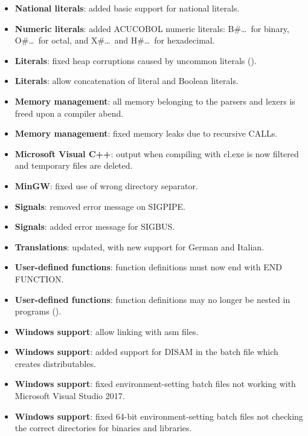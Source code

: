 \begin{itemize}
\item \textbf{National literals}: added basic support for national literals.
\item \textbf{Numeric literals}: added ACUCOBOL numeric literals: B\#\ldots\, for binary, O\#\ldots\, for octal, and X\#\ldots\ and H\#\ldots\, for hexadecimal.
\item \textbf{Literals}: fixed heap corruptions caused by uncommon literals ().
\item \textbf{Literals}: allow concatenation of literal and Boolean literals.
\item \textbf{Memory management}: all memory belonging to the parsers and lexers is freed upon a compiler abend.
\item \textbf{Memory management}: fixed memory leaks due to recursive CALLs.
\item \textbf{Microsoft Visual C++}: output when compiling with cl.exe is now filtered and temporary files are deleted.
\item \textbf{MinGW}: fixed use of wrong directory separator.
\item \textbf{Signals}: removed error message on SIGPIPE.
\item \textbf{Signals}: added error message for SIGBUS.
\item \textbf{Translations}: updated, with new support for German and Italian.
\item \textbf{User-defined functions}: function definitions must now end with END FUNCTION.
\item \textbf{User-defined functions}: function definitions may no longer be nested in programs ().
\item \textbf{Windows support}: allow linking with asm files.
\item \textbf{Windows support}: added support for DISAM in the batch file which creates distributables.
\item \textbf{Windows support}: fixed environment-setting batch files not working with Microsoft Visual Studio 2017.
\item \textbf{Windows support}: fixed 64-bit environment-setting batch files not checking the correct directories for binaries and libraries.
\end{itemize}


